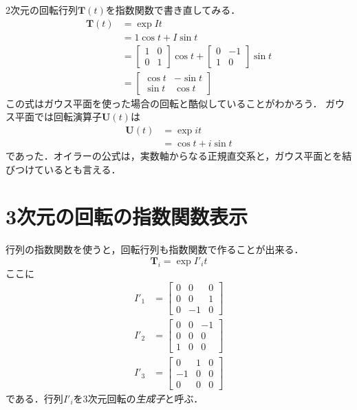 \documentclass{jsbook}
\newcommand{\keyword}[1]{\emph{#1}}
\newcommand{\bop}[1]{\boldsymbol{#1}}
\newcommand{\im}{i}%
\begin{document}
2次元の回転行列$\bop{T}(t)$を指数関数で書き直してみる．
\begin{align}
\bop{T}(t)&=\exp It\\
  &=1\cos t+I\sin t\\
  &=\begin{bmatrix}1&0\\0&1\end{bmatrix}\cos t+\begin{bmatrix}0&-1\\1&0\end{bmatrix}\sin t\\
  &=\begin{bmatrix}\cos t&-\sin t\\\sin t&\cos t\end{bmatrix}
\end{align}
この式はガウス平面を使った場合の回転と酷似していることがわかろう．
ガウス平面では回転演算子$\bop{U}(t)$は
\begin{align}
\bop{U}(t)&=\exp \im t\\
  &=\cos t+\im\sin t
\end{align}
であった．オイラーの公式は，実数軸からなる正規直交系と，ガウス平面とを結びつけているとも言える．




\section{3次元の回転の指数関数表示}

行列の指数関数を使うと，回転行列も指数関数で作ることが出来る．
\begin{equation}
\bop{T}_i=\exp I'_it
\end{equation}
ここに
\begin{align}
I'_1&=\begin{bmatrix}0&0&0\\0&0&1\\0&-1&0\end{bmatrix}\\
I'_2&=\begin{bmatrix}0&0&-1\\0&0&0\\1&0&0\end{bmatrix}\\
I'_3&=\begin{bmatrix}0&1&0\\-1&0&0\\0&0&0\end{bmatrix}
\end{align}
である．行列$I'_i$を3次元回転の\keyword{生成子}と呼ぶ．
\end{document}
